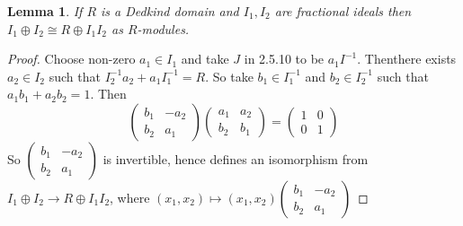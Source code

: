 \documentclass[a4paper,10pt]{article}
\newtheorem{lem}[thm]{Lemma}
\begin{document}
\begin{lem}
If $R$ is a Dedkind domain and $I_{1},I_{2}$ are fractional ideals then $I_{1}\oplus I_{2}\cong R\oplus I_{1}I_{2}$ as $R$-modules.
\end{lem}
\begin{proof}
Choose non-zero $a_{1}\in I_{1}$ and take $J$ in 2.5.10 to be $a_{1}I^{-1}$. Thenthere exists $a_{2}\in I_{2}$ such that $I_{2}^{-1}a_{2}+a_{1}I_{1}^{-1}=R$.  So take $b_{1}\in I_{1}^{-1}$ and $b_{2}\in I_{2}^{-1}$ such that $a_{1}b_{1}+a_{2}b_{2}=1$. Then
$$\left( \begin{array} {cc}
b_{1} & -a_{2} \\
b_{2} & a_{1} \end{array} \right)
\left( \begin{array} {cc}
a_{1} & a_{2} \\
b_{2} & b_{1} \end{array} \right)=
\left( \begin{array} {cc}
1 & 0 \\
0 & 1 \end{array} \right)$$
So $\left( \begin{array} {cc}
b_{1} & -a_{2} \\
b_{2} & a_{1} \end{array} \right)$ is invertible, hence defines an isomorphism from $I_{1}\oplus I_{2}\rightarrow R\oplus I_{1}I_{2}$, where $(x_{1},x_{2})\mapsto (x_{1},x_{2})\left( \begin{array} {cc}
b_{1} & -a_{2} \\
b_{2} & a_{1} \end{array} \right)$
\end{proof}
\end{document}
